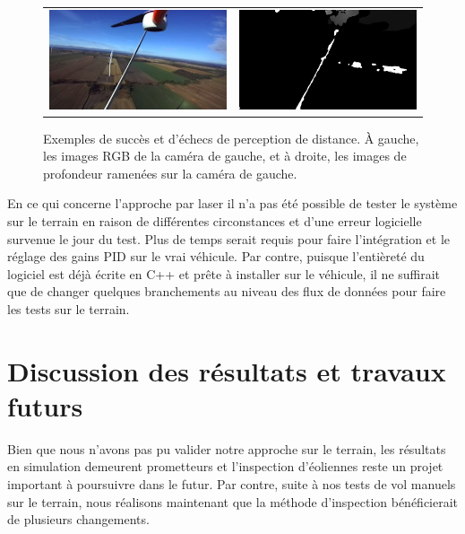 \begin{figure}
\begin{tabular}{cc}
    \includegraphics[width=0.5\linewidth]{images/field_stereo_success_rgb2.png} &
    \includegraphics[width=0.5\linewidth]{images/field_stereo_success_pcl2.png} \\
  \end{tabular}
  \caption[Exemples de succès et d'échecs de perception de distance]{
  Exemples de succès et d'échecs de perception de distance. À gauche, les images RGB de la caméra de gauche, et à droite, les images de profondeur ramenées sur la caméra de gauche.}
  \label{fig:field_stereo_fail}
\end{figure}

En ce qui concerne l'approche par laser il n'a pas été possible de tester le système sur le terrain en raison de différentes circonstances et d'une erreur logicielle survenue le jour du test. Plus de temps serait requis pour faire l'intégration et le réglage des gains PID sur le vrai véhicule. Par contre, puisque l'entièreté du logiciel est déjà écrite en C++ et prête à installer sur le véhicule, il ne suffirait que de changer quelques branchements au niveau des flux de données pour faire les tests sur le terrain.

\clearpage
\section{Discussion des résultats et travaux futurs}
\label{uav:results_conclusion_future_work}

Bien que nous n'avons pas pu valider notre approche sur le terrain, les résultats en simulation demeurent prometteurs et l'inspection d'éoliennes reste un projet important à poursuivre dans le futur. Par contre, suite à nos tests de vol manuels sur le terrain, nous réalisons maintenant que la méthode d'inspection bénéficierait de plusieurs changements.

